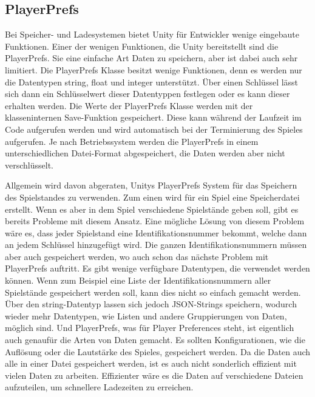 \subsection{PlayerPrefs}
Bei Speicher- und Ladesystemen bietet Unity für Entwickler wenige eingebaute Funktionen. Einer der wenigen Funktionen, die Unity bereitstellt sind die PlayerPrefs. Sie eine einfache Art Daten zu speichern, aber ist dabei auch sehr limitiert. Die PlayerPrefs Klasse besitzt wenige Funktionen, denn es werden nur die Datentypen string, float und integer unterstützt. Über einen Schlüssel lässt sich dann ein Schlüsselwert dieser Datentyppen festlegen oder es kann dieser erhalten werden. Die Werte der PlayerPrefs Klasse werden mit der klasseninternen Save-Funktion gespeichert. Diese kann während der Laufzeit im Code aufgerufen werden und wird automatisch bei der Terminierung des Spieles aufgerufen.\cite{unityPlayerPrefsSave} Je nach Betriebssystem werden die PlayerPrefs in einem unterschiedlichen Datei-Format abgespeichert, die Daten werden aber nicht verschlüsselt.
\cite{unityPlayerPrefs}

Allgemein wird davon abgeraten, Unitys PlayerPrefs System für das Speichern des Spielstandes zu verwenden. Zum einen wird für ein Spiel eine Speicherdatei erstellt. Wenn es aber in dem Spiel verschiedene Spielstände geben soll, gibt es bereits Probleme mit diesem Ansatz. Eine mögliche Lösung von diesem Problem wäre es, dass jeder Spielstand eine Identifikationsnummer bekommt, welche dann an jedem Schlüssel hinzugefügt wird. Die ganzen Identifikationsnummern müssen aber auch gespeichert werden, wo auch schon das nächste Problem mit PlayerPrefs auftritt. Es gibt wenige verfügbare Datentypen, die verwendet werden können. Wenn zum Beispiel eine Liste der Identifikationsnummern aller Spielstände gespeichert werden soll, kann dies nicht so einfach gemacht werden. Über den string-Datentyp lassen sich jedoch JSON-Strings speichern, wodurch wieder mehr Datentypen, wie Listen und andere Gruppierungen von Daten, möglich sind. Und PlayerPrefs, was für Player Preferences steht, ist eigentlich auch genaufür die Arten von Daten gemacht. Es sollten Konfigurationen, wie die Auflösung oder die Lautstärke des Spieles, gespeichert werden. Da die Daten auch alle in einer Datei gespeichert werden, ist es auch nicht sonderlich effizient mit vielen Daten zu arbeiten. Effizienter wäre es die Daten auf verschiedene Dateien aufzuteilen, um schnellere Ladezeiten zu erreichen.
\cite{unityPersistentData}\cite{logrocketPlayerPrefs}\cite{gamedevbeginnerPlayerPrefs}

